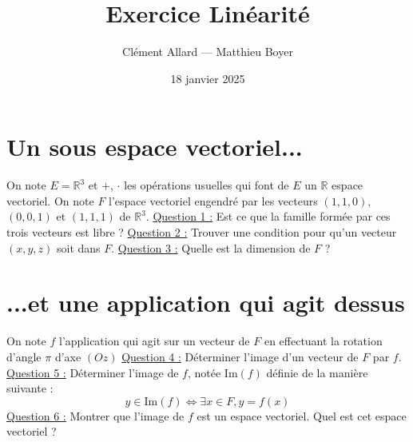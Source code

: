 \documentclass{classe}
\title{Exercice Linéarité}
\author{Clément Allard --- Matthieu Boyer}
\date{18 janvier 2025}
\renewcommand{\question}[1]{\underline{Question #1 :}}
\begin{document}
\section{Un sous espace vectoriel...}

On note $E = \mathbb{R}^3$ et $+$, $\cdot$ les opérations usuelles qui font de $E$ un $\mathbb{R}$ espace vectoriel. On note $F$ l'espace vectoriel engendré par les vecteurs $(1, 1, 0)$, $(0, 0, 1)$ et $(1, 1, 1)$ de $\mathbb{R}^3$.
\newline
\newline
\question{1} Est ce que la famille formée par ces trois vecteurs est libre ?
\newline
\newline
\question{2} Trouver une condition pour qu'un vecteur $(x, y, z)$ soit dans $F$.
\newline
\newline
\question{3} Quelle est la dimension de $F$ ?

\section{...et une application qui agit dessus}

On note $f$ l'application qui agit sur un vecteur de $F$ en effectuant la rotation d'angle $\pi$ d'axe $(Oz)$
\newline
\newline
\question{4} Déterminer l'image d'un vecteur de $F$ par $f$.
\newline
\newline
\question{5} Déterminer l'image de $f$, notée $\mathrm{Im}(f)$ définie de la manière suivante :
\begin{equation*}
y\in \mathrm{Im}(f) \iff \exists x \in F, y=f(x)
\end{equation*}
\question{6} Montrer que l'image de $f$ est un espace vectoriel. Quel est cet espace vectoriel ?
\end{document}
